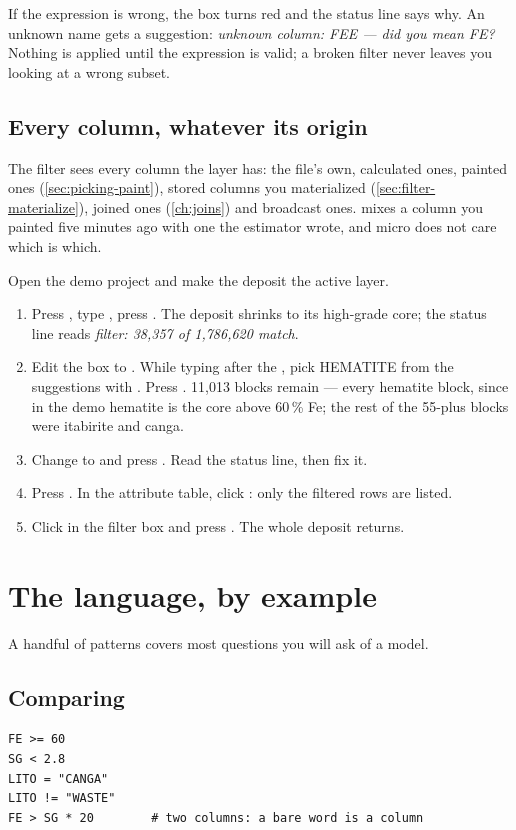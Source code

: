 If the expression is wrong, the box turns red and the status line says why. An unknown name gets a suggestion: \emph{unknown column: FEE — did you mean FE?} Nothing is applied until the expression is valid; a broken filter never leaves you looking at a wrong subset.

\subsection{Every column, whatever its origin}
The filter sees every column the layer has: the file's own, calculated ones, painted ones (\cref{sec:picking-paint}), stored columns you materialized (\cref{sec:filter-materialize}), joined ones (\cref{ch:joins}) and broadcast ones.  mixes a column you painted five minutes ago with one the estimator wrote, and micro does not care which is which.

\begin{tryit}
Open the demo project and make the deposit the active layer.
\begin{enumerate}
\item Press \key{/}, type , press . The deposit shrinks to its high-grade core; the status line reads \emph{filter: 38,357 of 1,786,620 match}.
\item Edit the box to . While typing after the \code{=}, pick HEMATITE from the suggestions with . Press . 11,013 blocks remain — every hematite block, since in the demo hematite is the core above 60\,\% Fe; the rest of the 55-plus blocks were itabirite and canga.
\item Change  to  and press . Read the status line, then fix it.
\item Press . In the attribute table, click : only the filtered rows are listed.
\item Click in the filter box and press . The whole deposit returns.
\end{enumerate}
\end{tryit}

\section{The language, by example}\label{sec:filter-language}
A handful of patterns covers most questions you will ask of a model.

\subsection{Comparing}
\begin{lstlisting}[language=expr]
FE >= 60
SG < 2.8
LITO = "CANGA"
LITO != "WASTE"
FE > SG * 20        # two columns: a bare word is a column
\end{lstlisting}


